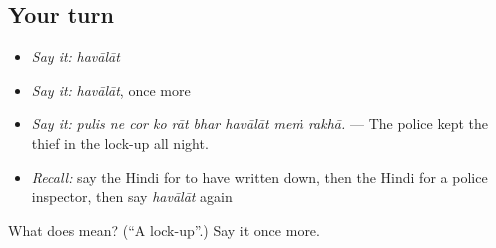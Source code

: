 \subsection*{Your turn}
\begin{itemize}
\raggedright
  \item \emph{Say it:} \emph{havālāt}
  \item \emph{Say it:} \emph{havālāt}, once more
  \item \emph{Say it:} \emph{pulis ne cor ko rāt bhar havālāt meṁ rakhā.} — The police kept the thief in the lock-up all night.
  \item \emph{Recall:} say the Hindi for to have written down, then the Hindi for a police inspector, then say \emph{havālāt} again
\end{itemize}

\begin{tcolorbox}[breakable,colback=teal!4,colframe=teal!35!black,title={Before you move on}]
What does  mean? (\textquotedblleft{}A lock-up\textquotedblright{}.) Say it once more.
\end{tcolorbox}
